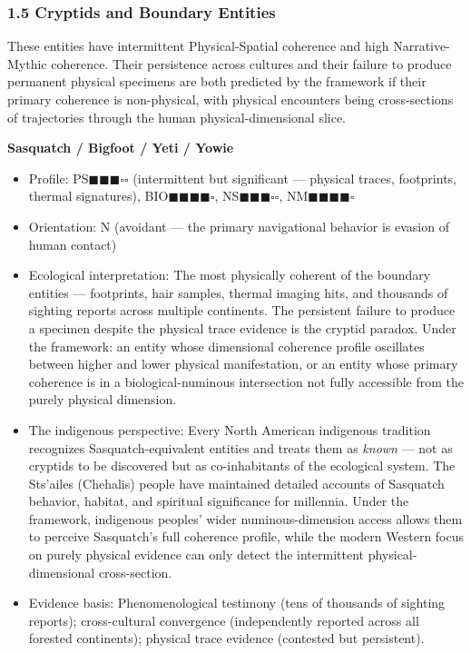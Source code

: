 \subsubsection*{1.5 Cryptids and Boundary Entities}


These entities have intermittent Physical-Spatial coherence and high Narrative-Mythic coherence. Their persistence across cultures and their failure to produce permanent physical specimens are both predicted by the framework if their primary coherence is non-physical, with physical encounters being cross-sections of trajectories through the human physical-dimensional slice.


\textbf{Sasquatch / Bigfoot / Yeti / Yowie}

\begin{itemize}[nosep,leftmargin=*]
  \item Profile: PS$\blacksquare$$\blacksquare$$\blacksquare$$\square$$\square$ (intermittent but significant — physical traces, footprints, thermal signatures), BIO$\blacksquare$$\blacksquare$$\blacksquare$$\blacksquare$$\square$, NS$\blacksquare$$\blacksquare$$\blacksquare$$\square$$\square$, NM$\blacksquare$$\blacksquare$$\blacksquare$$\blacksquare$$\square$
  \item Orientation: N (avoidant — the primary navigational behavior is evasion of human contact)
  \item Ecological interpretation: The most physically coherent of the boundary entities — footprints, hair samples, thermal imaging hits, and thousands of sighting reports across multiple continents. The persistent failure to produce a specimen despite the physical trace evidence is the cryptid paradox. Under the framework: an entity whose dimensional coherence profile oscillates between higher and lower physical manifestation, or an entity whose primary coherence is in a biological-numinous intersection not fully accessible from the purely physical dimension.
  \item The indigenous perspective: Every North American indigenous tradition recognizes Sasquatch-equivalent entities and treats them as \textit{known} — not as cryptids to be discovered but as co-inhabitants of the ecological system. The Sts'ailes (Chehalis) people have maintained detailed accounts of Sasquatch behavior, habitat, and spiritual significance for millennia. Under the framework, indigenous peoples' wider numinous-dimension access allows them to perceive Sasquatch's full coherence profile, while the modern Western focus on purely physical evidence can only detect the intermittent physical-dimensional cross-section.
  \item Evidence basis: Phenomenological testimony (tens of thousands of sighting reports); cross-cultural convergence (independently reported across all forested continents); physical trace evidence (contested but persistent).
\end{itemize}


